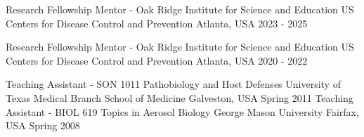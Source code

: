 

\begin{cventries}

  \vspace{-4.0mm}
  \cventry
    {Research Fellowship Mentor - Oak Ridge Institute for Science and Education} %
    {US Centers for Disease Control and Prevention} %
    {Atlanta, USA} %
    {2023 - 2025} %
    {} 
      \vspace{-2.0mm} 

  \vspace{-4.0mm}
  \cventry
    {Research Fellowship Mentor - Oak Ridge Institute for Science and Education} %
    {US Centers for Disease Control and Prevention} %
    {Atlanta, USA} %
    {2020 - 2022} %
    {} 
      \vspace{-2.0mm} 

  \vspace{-4.0mm}
  \cventry
    {Teaching Assistant - SON 1011 Pathobiology and Host Defenses} %
    {University of Texas Medical Branch School of Medicine} %
    {Galveston, USA} %
    {Spring 2011} %
    {} 
      \vspace{-2.0mm}
  \cventry
    {Teaching Assistant - BIOL 619 Topics in Aerosol Biology} %
    {George Mason University} %
    {Fairfax, USA} %
    {Spring 2008} %
    {}
  \vspace{-4.0mm}
\end{cventries}
